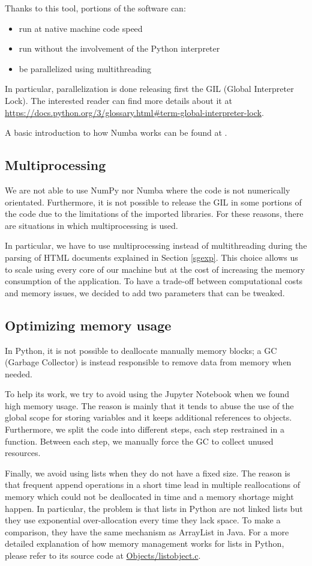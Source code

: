 Thanks to this tool, portions of the software can:
\begin{itemize}
    \item run at native machine code speed
    \item run without the involvement of the Python interpreter
    \item be parallelized using multithreading
\end{itemize}
In particular, parallelization is done releasing first the GIL (Global Interpreter Lock).
The interested reader can find more details about it
at \url{https://docs.python.org/3/glossary.html\#term-global-interpreter-lock}.

A basic introduction to how Numba works can be found at \cite{10.1145/2833157.2833162}.

\subsection{Multiprocessing}
We are not able to use NumPy nor Numba where the code is not numerically orientated.
Furthermore, it is not possible to release the GIL in some portions of the code
due to the limitations of the imported libraries.
For these reasons, there are situations in which multiprocessing is used.

In particular, we have to use multiprocessing instead of multithreading during the parsing of
HTML documents explained in Section \ref{sgexp}.
This choice allows us to scale using every core of our machine
but at the cost of increasing the memory consumption of the application.
To have a trade-off between computational costs
and memory issues, we decided to add two parameters that can be tweaked.

\subsection{Optimizing memory usage}
In Python, it is not possible to deallocate manually memory blocks; a GC (Garbage Collector)
is instead responsible to remove data from memory when needed.

To help its work, we try to avoid using the Jupyter Notebook when we found high memory usage.
The reason is mainly that it tends to abuse the use of the global scope for storing variables
and it keeps additional references to objects. Furthermore, we split the code into different steps,
each step restrained in a function.
Between each step, we manually force the GC to collect unused resources.

Finally, we avoid using lists when they do not have a fixed size.
The reason is that frequent append operations in a short time lead in multiple reallocations of
memory which could not be deallocated in time and a memory shortage might happen.
In particular, the problem is that lists in Python are not linked lists but they use
exponential over-allocation every time they lack space. To make a comparison, they have the same
mechanism as ArrayList in Java.
For a more detailed explanation of how memory management works for lists in Python, please refer to
its source code at
\href{https://github.com/python/cpython/blob/3.7/Objects/listobject.c}{Objects/listobject.c}.
